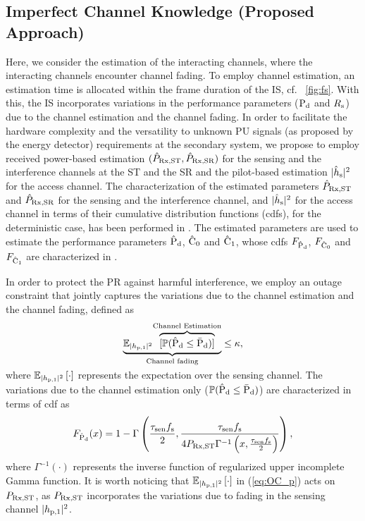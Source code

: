 \subsection{Imperfect Channel Knowledge (Proposed Approach)} \label{ssec:ice}
Here, we consider the estimation of the interacting channels, where the interacting channels encounter channel fading. To employ channel estimation, an estimation time is allocated within the frame duration of the IS, cf. \figurename~\ref{fig:fs}. With this, the IS incorporates variations in the performance parameters ($\text{P}_{\text{d}}$ and $R_{\text{s}}$) due to the channel estimation and the channel fading. In order to facilitate the hardware complexity and the versatility to unknown PU signals (as proposed by the energy detector) requirements at the secondary system, we propose to employ received power-based estimation $(\hat{P}_{\text{Rx,ST}}, \hat{P}_{\text{Rx,SR}})$ for the sensing and the interference channels at the ST and the SR and the pilot-based estimation $|\hat{h}_{\text{s}}|^2$ for the access channel. The characterization of the estimated parameters $\hat{P}_{\text{Rx,ST}}$ and $\hat{P}_{\text{Rx,SR}}$ for the sensing and the interference channel, and $|\hat{h}_{\text{s}}|^2$ for the access channel in terms of their cumulative distribution functions (cdfs), for the deterministic case, has been performed in \cite[cf. Section III-B]{Kaushik16}. The estimated parameters are used to estimate the performance parameters $\hat{\text{P}}_{\text{d}}$, $\hat{\text{C}}_0$ and $\hat{\text{C}}_1$, whose cdfs $F_{\hat{\text{P}}_{\text{d}}}$, $F_{\hat{\text{C}}_0}$ and $F_{\hat{\text{C}}_1}$ are characterized in \cite[cf. Lemma 1, Lemma 2 and Lemma 3]{Kaushik16}. %

In order to protect the PR against harmful interference, we employ an outage constraint that jointly captures the variations due to the channel estimation and the channel fading, defined as 
\begin{align}
\smash[b]{\underbrace{\mathbb{E}_{\phpo}{\smash[b]{\overbrace{[\p( \epd \le \pdd)]}^{\text{Channel Estimation}}}}}_{\text{Channel fading}}} &\le \mpd, \label{eq:OC_p} \\[-0.3em] \nonumber 
\end{align}
where ${\mathbb E}_{|h_{\text{p,1}}|^2}\left[ \cdot \right]$ represents the expectation over the sensing channel. The variations due to the channel estimation only ($\mathbb P(\hat{\text{P}}_{\text{d}} \le \bar{\text{P}}_{\text{d}})$) are characterized in terms of cdf as \cite{Kaushik16}
\begin{align}
\fpd(x) = 1 - \Gamma \left( \frac{\tsen \fsam}{2}, \frac{\tsen \fsam}{4 \prcvd \Gamma^{-1}\left(x, \frac{\tsen \fsam}{2} \right)} \right), \label{eq:dis_pd}
\end{align}
where $\Gamma^{-1}(\cdot)$ represents the inverse function of regularized upper incomplete Gamma function. It is worth noticing that ${\mathbb E}_{|h_{\text{p,1}}|^2}\left[ \cdot \right]$ in (\ref{eq:OC_p}) acts on $P_{\text{Rx,ST}}$, as $P_{\text{Rx,ST}}$ incorporates the variations due to fading in the sensing channel $|h_{\text{p,1}}|^2$.

